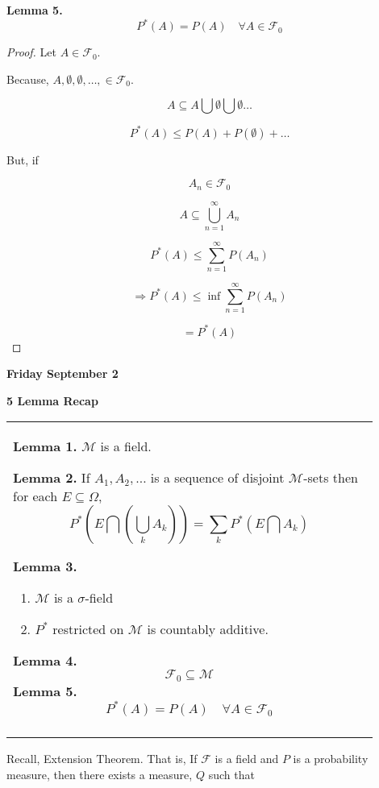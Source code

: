 \documentclass[11pt,fleqn]{book} %
\begin{document}
\textbf{Lemma 5.}$$P^*(A) = P(A) \quad \forall A \in \mathcal{F}_0$$

\begin{proof}
	Let $A \in \mathcal{F}_0$. 

	Because,  $A, \emptyset, \emptyset, \dots, \in \mathcal{F}_0$. 

	$$A \subseteq A \bigcup \emptyset \bigcup \emptyset \dots $$

	$$P^*(A) \leq P(A) + P(\emptyset) + \dots $$

But, if 

$$A_n \in \mathcal{F}_0$$

$$A \subseteq \bigcup^\infty_{n=1} A_n $$

$$P^*(A) \leq \displaystyle \sum^\infty_{n=1} P(A_n)$$

$$\Rightarrow P^*(A) \leq \inf \displaystyle \sum^\infty_{n=1} P(A_n) $$

$$ = P^*(A)$$
\end{proof}

\textbf{Friday September 2}

\begin{remark}
	\textbf{5 Lemma Recap}

	\begin{tabular}{|p{0.9\linewidth}|}\hline %
\rule{0pt}{5ex}%
		
	\textbf{Lemma 1.} $\mathcal{M}$ is a field.

	\textbf{Lemma 2.} If $A_1, A_2, \dots$ is a sequence of disjoint $\mathcal{M}$-sets then for each $E \subseteq \Omega$, 
	$$P^*(E\bigcap(\bigcup_k A_k)) = \displaystyle \sum_k P^*(E \bigcap A_k) $$

	\textbf{Lemma 3.}
	
	\begin{enumerate}
		\item $\mathcal{M}$ is a $\sigma$-field
		\item $P^*$ restricted on $\mathcal{M}$ is countably additive. 
	\end{enumerate}
	
	\textbf{Lemma 4.} $$\mathcal{F}_0 \subseteq \mathcal{M}$$
	\textbf{Lemma 5.}$$P^*(A) = P(A) \quad \forall A \in \mathcal{F}_0$$
	\text{ }\\
	\\\hline
\end{tabular}
\end{remark}

Recall, Extension Theorem. That is, If $\mathcal{F}$ is a field and $P$ is a probability measure, then there exists a measure, $Q$ such that 
\end{document}

